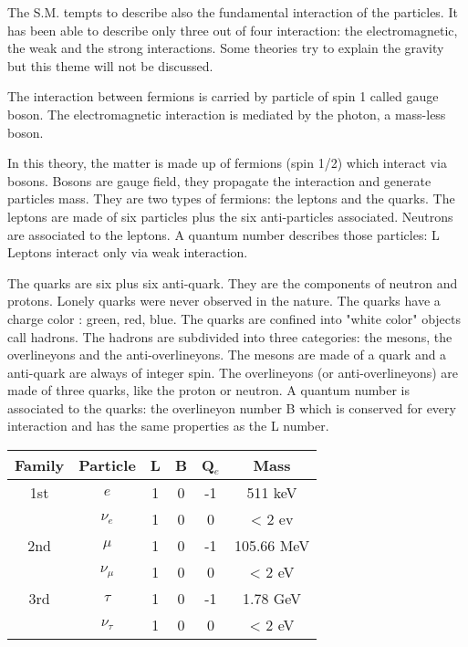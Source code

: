     The S.M. tempts to describe also the fundamental interaction of the particles. It has been able to describe only three out of four interaction: the electromagnetic, the weak and the strong interactions. Some theories try to explain the gravity but this theme will not be discussed.

	The interaction between fermions is carried by particle of spin 1 called gauge boson. The electromagnetic interaction is mediated by the photon, a mass-less boson.

    In this theory, the matter is made up of fermions (spin 1/2) which interact via bosons. 
    Bosons are gauge field, they propagate the interaction and generate particles mass.
    They are two types of fermions: the leptons and the quarks. 
    The leptons are made of six particles plus the  six anti-particles associated. 
    Neutrons are associated to the leptons.
    A quantum number describes those particles: L
    Leptons interact only via weak interaction.

    The quarks are six plus six anti-quark. 
    They are the components of neutron and protons.
    Lonely quarks were never observed in the nature.
    The quarks have a charge color : green, red, blue.
    The quarks are confined into "white color" objects call hadrons.
    The hadrons are subdivided into three categories: the mesons, the overlineyons and the anti-overlineyons.
    The mesons are made of a quark and a anti-quark are always of integer spin.
    The overlineyons (or anti-overlineyons) are made of three quarks, like the proton or neutron.
    A quantum number is associated to the quarks: the overlineyon number B which is conserved for every interaction and has the same properties as the L number.


    \begin{center}
        \begin{tabular}{c|c|c|c|c|c}
        Family & Particle  & L & B & Q$_e$ & Mass  \tabularnewline
        \hline %
        \hline %
        1st    & $e$       & 1 & 0 & -1    & 511 keV \tabularnewline
        \hline %
               & $\nu_e$   & 1 & 0 & 0     & < 2 ev \tabularnewline
        \hline %
        2nd    & $\mu$     & 1 & 0 & -1    & 105.66 MeV \tabularnewline
        \hline %
               & $\nu_{\mu}$ & 1 & 0 & 0   & < 2 eV \tabularnewline
        \hline %
        3rd    & $\tau$   & 1 & 0 & -1     & 1.78 GeV \tabularnewline
        \hline %
               & $\nu_{\tau}$ & 1 & 0 & 0  & < 2 eV \tabularnewline
        \end{tabular}
    \end{center}

